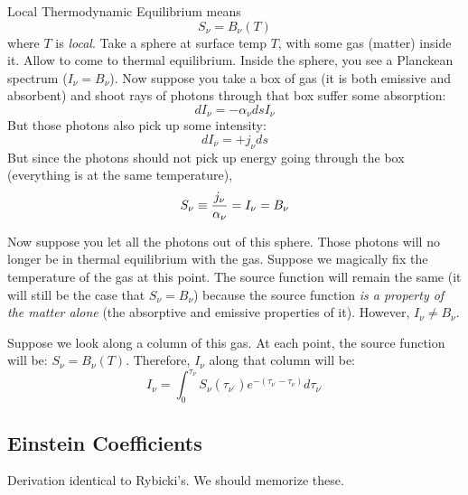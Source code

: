 \documentclass[11pt]{article}
\begin{document}
Local Thermodynamic Equilibrium means 
$$S_\nu=B_\nu(T)$$
where $T$ is {\it local}.
Take a sphere at surface temp $T$, with some gas (matter) inside it.   Allow
to come to thermal equilibrium.  Inside the sphere, 
you see a Planckean spectrum ($I_\nu = B_\nu$).  Now suppose you take a box of
gas (it is both emissive and absorbent) and shoot rays of photons through
that box suffer some absorption: 
$$dI_\nu = -\alpha _\nu ds I_\nu$$
But
those photons also pick up some intensity: 
$$dI_\nu = +j_\nu ds$$
But since the photons
should not pick up energy going through the box (everything is at the same
temperature), 
$$S_\nu\equiv{j_\nu\over\alpha_\nu}=I_\nu=B_\nu$$

Now suppose you let all the photons out of this sphere.  Those photons will
no longer be in thermal equilibrium with the gas.  Suppose we magically fix
the temperature of the gas at this point.  The source function will remain the
same (it will still be the case that $S_\nu = B_\nu$) because the source 
function {\it is a property of the matter alone} (the absorptive and emissive 
properties of it).  However, $I_\nu\ne B_\nu$.\par

Suppose we look along a column of this gas.  At each point, the source
function will be: $S_\nu=B_\nu(T)$.  Therefore, $I_\nu$ along that column
will be: 
\def\np{{\nu^\prime}}
$$I_\nu=\int_0^{\tau_\nu}{S_\nu(\tau_\np)e^{-(\tau_\np-\tau_\nu)}d\tau_\np}$$

\subsection*{ Einstein Coefficients}

Derivation identical to Rybicki's.  We should memorize these.\par
\end{document}
